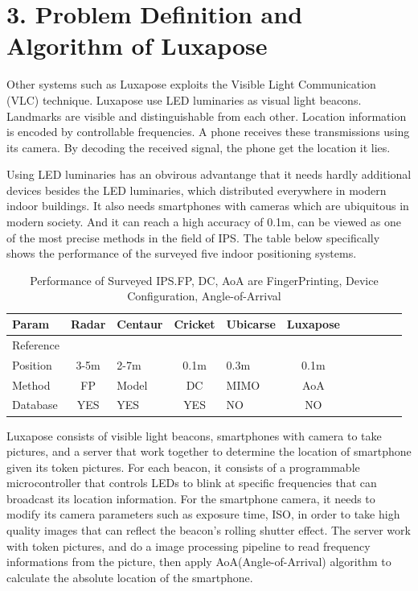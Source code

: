 \documentclass[a4paper, 11pt]{article} %
\begin{document}
\section*{3. Problem Definition and Algorithm of Luxapose}
Other systems such as Luxapose exploits the Visible Light Communication (VLC) technique. Luxapose use LED luminaries as visual light beacons. Landmarks are visible and distinguishable from each other. Location information is encoded by controllable frequencies. A phone receives these transmissions using its camera. By decoding the received signal, the phone get the location it lies.

Using LED luminaries has an obvirous advantange that it needs hardly additional devices besides the LED luminaries, which distributed everywhere in modern indoor buildings. It also needs smartphones with cameras which are ubiquitous in modern society. And it can reach a high accuracy of 0.1m, can be viewed as one of the most precise methods in the field of IPS. The table below specifically shows the performance of the surveyed five indoor positioning systems.

\begin{table}[htbp]	
	\centering 
	\begin{tabular}{lclclclclcl}
		\toprule
		Param & Radar & Centaur & Cricket & Ubicarse & Luxapose \\
		\midrule
		Reference & \cite{Radar00} & \cite{Centaur12} & \cite{Cricket04} & \cite{Ubicarse14} & \cite{Luxapose14}\\
		Position & 3-5m & 2-7m & 0.1m & 0.3m & 0.1m\\
		Method & FP & Model & DC & MIMO & AoA\\
		Database & YES & YES & YES & NO & NO\\
		\bottomrule
	\end{tabular}
	\caption{\label{tab:test}Performance of Surveyed IPS.FP, DC, AoA are FingerPrinting, Device Configuration, Angle-of-Arrival}
\end{table}


Luxapose consists of visible light beacons, smartphones with camera to take pictures, and a server that work together to determine the location of smartphone given its token pictures. For each beacon, it consists of a programmable microcontroller that controls LEDs to blink at specific frequencies that can broadcast its location information. For the smartphone camera, it needs to modify its camera parameters such as exposure time, ISO, in order to take high quality images that can reflect the beacon's rolling shutter effect. The server work with token pictures, and do a image processing pipeline to read frequency informations from the picture, then apply AoA(Angle-of-Arrival) algorithm to calculate the absolute location of the smartphone.
\end{document}
